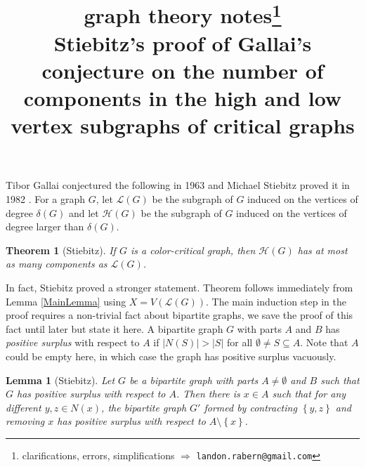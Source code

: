 \documentclass[12pt]{article}
\title{graph theory notes\thanks{clarifications, errors, simplifications $\Rightarrow$ \texttt{landon.rabern@gmail.com}}\\ \bigskip
Stiebitz's proof of Gallai's conjecture on the number of components in the high and low vertex subgraphs of critical graphs}
\date{}
\theoremstyle{plain}
\newtheorem{lem}[thm]{Lemma}
\newtheorem*{Theorem}{Theorem}
\theoremstyle{definition}
\theoremstyle{remark}
\newcommand{\fancy}[1]{\mathcal{#1}}
\renewcommand{\L}{\fancy{L}}
\newcommand{\set}[1]{\left\{ #1 \right\}}
\def\L{\fancy{L}}
\def\H{\fancy{H}}
\begin{document}
\maketitle

Tibor Gallai conjectured the following in 1963 \cite{gallai1963kritische, gallai1963kritische2} and Michael Stiebitz proved it in 1982 \cite{stiebitz1982proof}.  For a graph $G$,
let $\L(G)$ be the subgraph of $G$ induced on the vertices of degree $\delta(G)$ and let $\H(G)$ be the subgraph of $G$ induced on the vertices of degree larger than $\delta(G)$.

\begin{Theorem}[Stiebitz]
If $G$ is a color-critical graph, then $\H(G)$ has at most as many components as $\L(G)$.
\end{Theorem}

In fact, Stiebitz proved a stronger statement.  Theorem follows immediately from Lemma \ref{MainLemma} using $X = V(\L(G))$.  The main induction step in the proof requires a non-trivial fact about bipartite graphs, we save the proof of this fact until later but state it here.  A bipartite graph $G$ with parts $A$ and $B$ has \emph{positive surplus} with respect to $A$ if $|N(S)| > |S|$ for all $\emptyset \ne S \subseteq A$.  Note that $A$ could be empty here, in which case the graph has positive surplus vacuously. 

\begin{lem}[Stiebitz]
Let $G$ be a bipartite graph with parts $A \ne \emptyset$ and $B$ such that $G$ has positive surplus with respect to $A$.   Then there is $x \in A$ such that for any different $y,z \in N(x)$, the bipartite graph $G'$ formed by contracting $\set{y,z}$ and removing $x$ has positive surplus with respect to $A \setminus \set{x}$.
\label{BipartiteLemma}
\end{lem}
\end{document}
